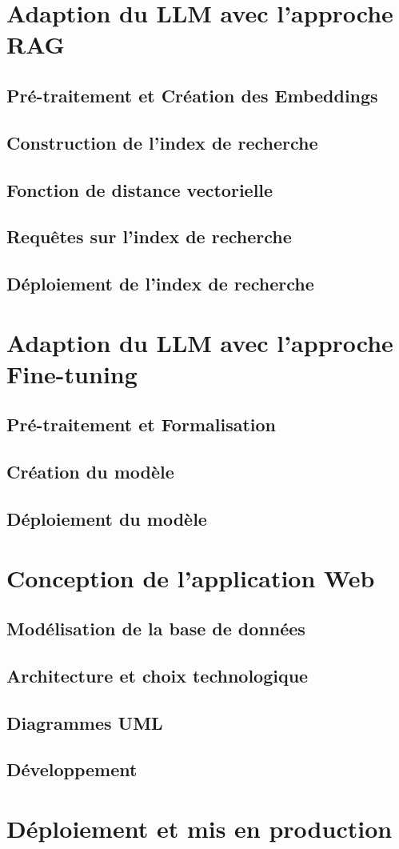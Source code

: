 \section{Adaption du LLM avec l'approche RAG}
\subsection{Pré-traitement et Création des Embeddings}
\subsection{Construction de l'index de recherche}
\subsection{Fonction de distance vectorielle}
\subsection{Requêtes sur l'index de recherche}
\subsection{Déploiement de l'index de recherche}

\section{Adaption du LLM avec l'approche Fine-tuning}
\subsection{Pré-traitement et Formalisation}
\subsection{Création du modèle}
\subsection{Déploiement du modèle}

\section{Conception de l'application Web}
\subsection{Modélisation de la base de données}
\subsection{Architecture et choix technologique}
\subsection{Diagrammes UML}
\subsection{Développement}

\section{Déploiement et mis en production}

